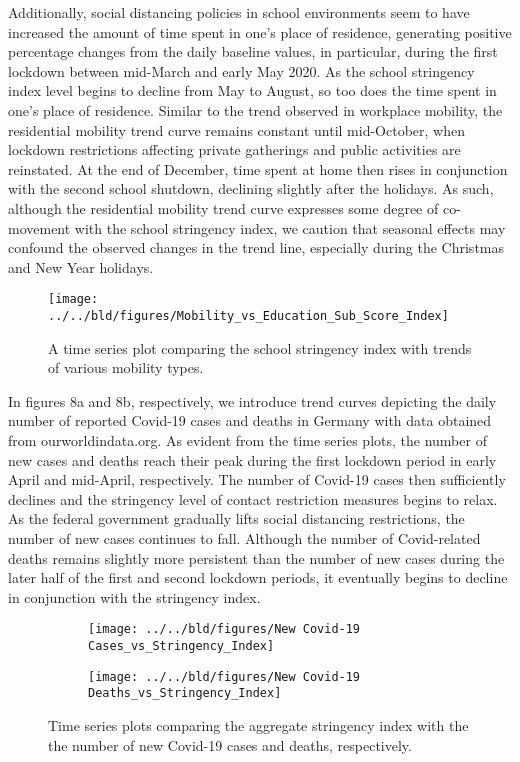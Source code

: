 Additionally, social distancing policies in school environments seem to have increased the amount of time spent in one’s place of residence, generating positive percentage changes from the daily baseline values, in particular, during the first lockdown between mid-March and early May 2020. As the school stringency index level begins to decline from May to August, so too does the time spent in one’s place of residence. Similar to the trend observed in workplace mobility, the residential mobility trend curve remains constant until mid-October, when lockdown restrictions affecting private gatherings and public activities are reinstated. At the end of December, time spent at home then rises in conjunction with the second school shutdown, declining slightly after the holidays. As such, although the residential mobility trend curve expresses some degree of co-movement with the school stringency index, we caution that seasonal effects may confound the observed changes in the trend line, especially during the Christmas and New Year holidays.

\begin{figure}[H]
      \centering
      \texttt{[image: ../../bld/figures/Mobility\_vs\_Education\_Sub\_Score\_Index]}
      \caption{A time series plot comparing the school stringency index with trends of various mobility types.}
      \label{fig:education vs mobility}
\end{figure}

In figures 8a and 8b, respectively, we introduce trend curves depicting the daily number of reported Covid-19 cases and deaths in Germany with data obtained from ourworldindata.org. As evident from the time series plots, the number of new cases and deaths reach their peak during the first lockdown period in early April and mid-April, respectively. The number of Covid-19 cases then sufficiently declines and the stringency level of contact restriction measures begins to relax. As the federal government gradually lifts social distancing restrictions, the number of new cases continues to fall. Although the number of Covid-related deaths remains slightly more persistent than the number of new cases during the later half of the first and second lockdown periods, it eventually begins to decline in conjunction with the stringency index.

\begin{figure}[H]
     \centering
     \begin{subfigure}[b]{0.95\textwidth}
         \centering
         \texttt{[image: ../../bld/figures/New Covid-19 Cases\_vs\_Stringency\_Index]}
         \caption{}
         \label{fig:cases}
     \end{subfigure}
     \hfill
     \begin{subfigure}[b]{0.95\textwidth}
         \centering
         \texttt{[image: ../../bld/figures/New Covid-19 Deaths\_vs\_Stringency\_Index]}
         \caption{}
         \label{fig:deaths}
     \end{subfigure}
        \caption{Time series plots comparing the aggregate stringency index with the the number of new Covid-19 cases and deaths, respectively.}
         \label{fig:cases and deaths}
\end{figure}

